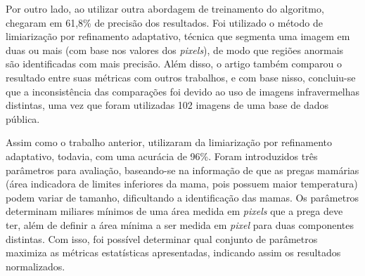 Por outro lado,  ao utilizar outra abordagem de treinamento do algoritmo, chegaram em 61,8\% de precisão dos resultados. Foi utilizado o método de limiarização por refinamento adaptativo, técnica que segmenta uma imagem em duas ou mais (com base nos valores dos \textit{pixels}), de modo que regiões anormais são identificadas com mais precisão. Além disso, o artigo também comparou o resultado entre suas métricas com outros trabalhos, e com base nisso, concluiu-se que a inconsistência das comparações foi devido ao uso de imagens infravermelhas distintas, uma vez que foram utilizadas 102 imagens de uma base de dados pública.

Assim como o trabalho anterior,  utilizaram da limiarização por refinamento adaptativo, todavia, com uma acurácia de 96\%. Foram introduzidos três parâmetros para avaliação, baseando-se na informação de que as pregas mamárias (área indicadora de limites inferiores da mama, pois possuem maior temperatura) podem variar de tamanho, dificultando a identificação das mamas. Os parâmetros determinam miliares mínimos de uma área medida em \textit{pixels} que a prega deve ter, além de definir a área mínima a ser medida em \textit{pixel} para duas componentes distintas. Com isso, foi possível determinar qual conjunto de parâmetros maximiza as métricas estatísticas apresentadas, indicando assim os resultados normalizados.


